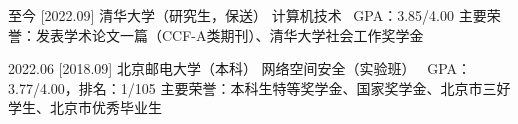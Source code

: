 \documentclass[zh]{resume}
\begin{document}
\makeheader

\begin{educations}
  \education%
    {至今}%
    [2022.09]%
    {清华大学（研究生，保送）}%
    {计算机技术 \textbullet\ GPA：3.85/4.00}%
    {}{主要荣誉：发表学术论文一篇（CCF-A类期刊）、清华大学社会工作奖学金}

  \separator{0.1ex}
  \education%
    {2022.06}%
    [2018.09]%
    {北京邮电大学（本科）}%
    {网络空间安全（实验班） \textbullet\ GPA：3.77/4.00，排名：1/105}%
    {}{主要荣誉：本科生特等奖学金、国家奖学金、北京市三好学生、北京市优秀毕业生}

\end{educations}
\end{document}
